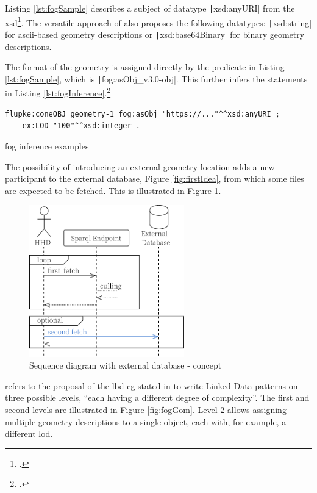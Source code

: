 Listing \ref{lst:fogSample} describes a subject of datatype \texttt|xsd:anyURI| from the \ac{xsd}\footcites{xsd}. The versatile approach of \cite{Bonduel2019} also proposes the following datatypes: \texttt|xsd:string| for \ac{ascii}-based geometry descriptions or \texttt|xsd:base64Binary| for binary geometry descriptions.

The format of the geometry is assigned directly by the predicate in Listing \ref{lst:fogSample}, which is \texttt|fog:asObj_v3.0-obj|. This further infers the statements in Listing \ref{lst:fogInference}.\footcite{fog}

\begin{listing}[H]
    \begin{verbatim}
flupke:coneOBJ_geometry-1 fog:asObj "https://..."^^xsd:anyURI ;
    ex:LOD "100"^^xsd:integer .
    \end{verbatim}
    \vspace{-0.7cm}
    \caption{\acs{fog} inference examples}
    \label{lst:fogInference}
\end{listing}

The possibility of introducing an external geometry location adds a new participant to the external database, Figure \ref{fig:firstIdea}, from which some files are expected to be fetched. This is illustrated in Figure \ref{fig:3participants}.

\begin{figure}[H]
    \centering
    \includegraphics[width=0.6\textwidth]{figures/pdf/3participants.pdf}
    \caption{Sequence diagram with external database - concept}
    \label{fig:3participants}
\end{figure}

\cite{Bonduel2019} refers to the proposal of the \ac{lbd-cg} stated in \cite{holten2018opm} to write Linked Data patterns on three possible levels, \enquote{each having a different degree of complexity}. The first and second levels are illustrated in Figure \ref{fig:fogGom}. Level 2 allows assigning multiple geometry descriptions to a single object, each with, for example, a different \ac{lod}.

